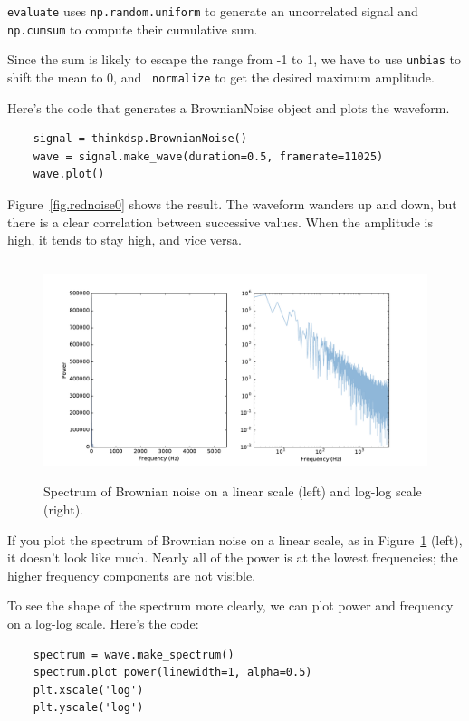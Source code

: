 \documentclass[12pt]{book}
\begin{document}
{\tt evaluate} uses {\tt np.random.uniform} to generate an
uncorrelated signal and {\tt np.cumsum} to compute their cumulative
sum.

Since the sum is likely to escape the range from -1 to
1, we have to use {\tt unbias} to shift the mean to 0, and {\tt
  normalize} to get the desired maximum amplitude.

Here's the code that generates a BrownianNoise object and plots the
waveform.

\begin{verbatim}
    signal = thinkdsp.BrownianNoise()
    wave = signal.make_wave(duration=0.5, framerate=11025)
    wave.plot()
\end{verbatim}

Figure~\ref{fig.rednoise0} shows the result.  The waveform
wanders up and down, but there is a clear correlation between
successive values.  When the amplitude is high, it tends to stay
high, and vice versa.

\begin{figure}
\centerline{\includegraphics[height=2.5in]{figs/rednoise3.pdf}}
\caption{Spectrum of Brownian noise on a linear scale (left) and
  log-log scale (right).}
\label{fig.rednoise3}
\end{figure}

If you plot the spectrum of Brownian noise on a linear scale, as
in Figure~\ref{fig.rednoise3} (left), it
doesn't look like much.  Nearly all of the power is at the lowest
frequencies; the higher frequency components are not visible.

To see the shape of the spectrum more clearly, we can plot power
and frequency on a log-log scale.  Here's the code:

\begin{verbatim}
    spectrum = wave.make_spectrum()
    spectrum.plot_power(linewidth=1, alpha=0.5)
    plt.xscale('log')
    plt.yscale('log')
\end{verbatim}
\end{document}

